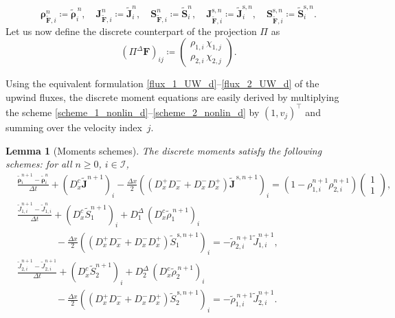 \documentclass[reqno]{amsart}
\newtheorem{Lemma}{Lemma}
\newcommand{\Dx}{\Delta x}
\newcommand{\II}{\mathcal{I}}
\newcommand{\Ft}{{\widetilde{F}}}
\newcommand{\rhot}{\widetilde{\rho}}
\newcommand{\Jt}{\widetilde{J}}
\newcommand{\St}{\widetilde{S}}
\newcommand{\Ftbf}{\mathbf{\Ft}}
\newcommand{\Fbf}{\mathbf{F}}
\newcommand{\Jbf}{\mathbf{J}}
\newcommand{\Sbf}{\mathbf{S}}
\newcommand{\rhobf}{\boldsymbol{\rho}}
\newcommand{\rhotbf}{\boldsymbol{\rhot}}
\newcommand{\Jtbf}{\mathbf{\Jt}}
\newcommand{\Stbf}{\mathbf{\St}}
\numberwithin{equation}{section}
\begin{document}
\begin{equation*}
    \rhobf^n_{\Ftbf,i}\coloneq\rhotbf^{\,n}_i,\quad \Jbf^n_{\Ftbf,i}\coloneq\Jtbf^n_i,\quad \Sbf^n_{\Ftbf,i}\coloneq\Stbf^n_i,\quad \Jbf^{\mathrm{s},n}_{\Ftbf,i}\coloneq\Jtbf^{\mathrm{s},n}_i,\quad \Sbf^{\mathrm{s},n}_{\Ftbf,i}\coloneq\Stbf^{\mathrm{s},n}_i.
\end{equation*}
Let us now define the discrete counterpart of the projection $\Pi$ as
\begin{equation}\label{def_Pi_discret}
    (\Pi^\Delta \Fbf)_{ij}\coloneq \begin{pmatrix}\rho_{1,i}\,\chi_{1,j}\\\rho_{2,i}\,\chi_{2,j}\end{pmatrix}.
\end{equation}

Using the equivalent formulation \eqref{flux_1_UW_d}–\eqref{flux_2_UW_d} of the upwind fluxes, the discrete moment equations are easily derived by multiplying the scheme \eqref{scheme_1_nonlin_d}--\eqref{scheme_2_nonlin_d} by $(1, v_j)^\top$ and summing over the velocity index~$j$.

\begin{Lemma}[Moments schemes]\label{lem_eq_moments_dis}
The discrete moments satisfy the following schemes: for all $n\geq 0$, $i\in\II$, 
    \begin{align}
        & \frac{ \rhotbf_{i}^{n+1}-\rhotbf_{i}^n}{\Delta t}+(D_x^c \Jtbf^{n+1})_i-\frac{\Dx}{2}\left((D_x^+D_x^-+D_x^-D_x^+)\Jtbf^{\,\mathrm{s},n+1}\right)_i=(1-\rho_{1,i}^{n+1}\rho_{2,i}^{n+1})\begin{pmatrix}1\\1 \end{pmatrix}, \label{scheme_rho_UW_d}\\
        &  \frac{\Jt_{1,i}^{n+1}-\Jt_{1,i}^n}{\Delta t}+(D_x^c\St^{n+1}_1)_i+D_1^\Delta\,(D_x^c\rhot^{\,n+1}_1)_i\nonumber \\
        & \qquad\qquad -\frac{\Dx}{2}\left((D_x^+D_x^-+D_x^-D_x^+)\St^{\,\mathrm{s},n+1}_1\right)_i=-\rhot^{\,n+1}_{2,i}\Jt^{n+1}_{1,i},\label{scheme_J1_UW_d}\\
        &  \frac{\Jt^{n+1}_{2,i}-\Jt^{n+1}_{2,i}}{\Delta t}+(D_x^c\St^{n+1}_2)_i+D_2^\Delta\,(D_x^c\rhot^{\,n+1}_2)_i\nonumber \\
        & \qquad\qquad-\frac{\Dx}{2}\left((D_x^+D_x^-+D_x^-D_x^+)\St^{\,\mathrm{s},n+1}_2\right)_i= -\rhot^{\,n+1}_{1,i}\Jt^{n+1}_{2,i}.\label{scheme_J2_UW_d}
    \end{align}
\end{Lemma}
\end{document}
